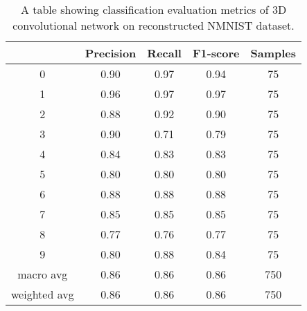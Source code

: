 \begin{table}[htb]
    \centering
    \begin{tabular}{|| c | c | c | c | c ||}
        \hline
             & Precision & Recall & F1-score & Samples \\
        \hline \hline
        0            & 0.90 & 0.97 & 0.94 & 75  \\
        \hline
        1            & 0.96 & 0.97 & 0.97 & 75  \\
        \hline
        2            & 0.88 & 0.92 & 0.90 & 75  \\
        \hline
        3            & 0.90 & 0.71 & 0.79 & 75  \\
        \hline
        4            & 0.84 & 0.83 & 0.83 & 75  \\
        \hline
        5            & 0.80 & 0.80 & 0.80 & 75  \\
        \hline
        6            & 0.88 & 0.88 & 0.88 & 75  \\
        \hline
        7            & 0.85 & 0.85 & 0.85 & 75  \\
        \hline
        8            & 0.77 & 0.76 & 0.77 & 75  \\
        \hline
        9            & 0.80 & 0.88 & 0.84 & 75  \\
        \hline
        macro avg    & 0.86 & 0.86 & 0.86 & 750 \\
        \hline
        weighted avg & 0.86 & 0.86 & 0.86 & 750 \\
        \hline
    \end{tabular}
    \caption{A table showing classification evaluation metrics of 3D convolutional network on reconstructed NMNIST dataset.}
    \label{tab:conv3d_nmnist_recon_evaluation_metrics}
\end{table}

